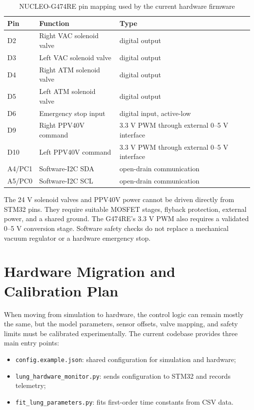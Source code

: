 \documentclass[11pt,a4paper]{article}
\begin{document}
\begin{table}[H]
\centering
\caption{NUCLEO-G474RE pin mapping used by the current hardware firmware}
\begin{tabular}{lll}
\toprule
\textbf{Pin} & \textbf{Function} & \textbf{Type} \\
\midrule
D2 & Right VAC solenoid valve & digital output \\
D3 & Left VAC solenoid valve & digital output \\
D4 & Right ATM solenoid valve & digital output \\
D5 & Left ATM solenoid valve & digital output \\
D6 & Emergency stop input & digital input, active-low \\
D9 & Right PPV40V command & 3.3 V PWM through external 0--5 V interface \\
D10 & Left PPV40V command & 3.3 V PWM through external 0--5 V interface \\
A4/PC1 & Software-I2C SDA & open-drain communication \\
A5/PC0 & Software-I2C SCL & open-drain communication \\
\bottomrule
\end{tabular}
\end{table}

The 24 V solenoid valves and PPV40V power cannot be driven directly from STM32 pins. They require suitable MOSFET stages, flyback protection, external power, and a shared ground. The G474RE's 3.3 V PWM also requires a validated 0--5 V conversion stage. Software safety checks do not replace a mechanical vacuum regulator or a hardware emergency stop.

\section{Hardware Migration and Calibration Plan}

When moving from simulation to hardware, the control logic can remain mostly the same, but the model parameters, sensor offsets, valve mapping, and safety limits must be calibrated experimentally. The current codebase provides three main entry points:

\begin{itemize}
  \item \texttt{config.example.json}: shared configuration for simulation and hardware;
  \item \texttt{lung\_hardware\_monitor.py}: sends configuration to STM32 and records telemetry;
  \item \texttt{fit\_lung\_parameters.py}: fits first-order time constants from CSV data.
\end{itemize}
\end{document}
